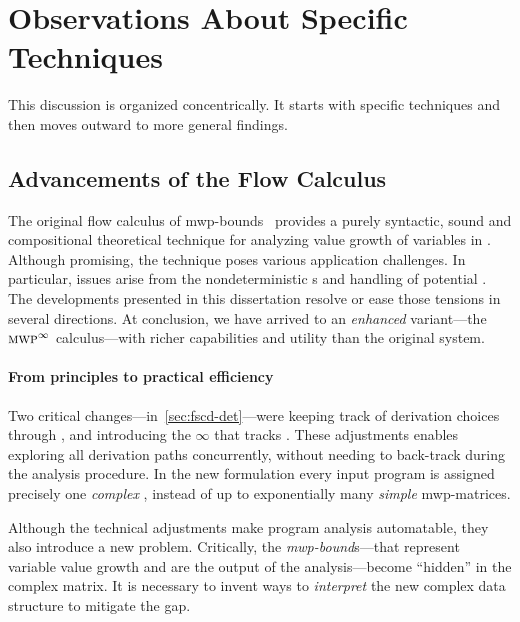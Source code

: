 \section{Observations About Specific Techniques}
\label{sec:res-specific}

This discussion is organized concentrically. It starts with specific techniques
and then moves outward to more general findings.

\subsection{Advancements of the Flow Calculus}
\label{subsec:res-flow-calc}

The original flow calculus of mwp-bounds~\cite{jones2009}
provides a purely syntactic, sound and
compositional theoretical technique for analyzing value
growth of variables in . Although promising, the
technique poses various application challenges. In particular, issues arise from
the nondeterministic s and handling of
potential . The developments presented in this
dissertation resolve or ease those tensions in several directions. At
conclusion, we have arrived to an \emph{enhanced} variant---\ie the
\(\textnormal{\textsc{mwp}}^\infty\) calculus---with richer capabilities and utility than the
original system.

\paragraph*{From principles to practical efficiency}
Two critical changes---in~\autoref{sec:fscd-det}---were keeping track of
derivation choices through \emph{}, and introducing
the  \(\infty\) that tracks . These adjustments enables exploring all derivation paths
{concurrently}, without needing to back-track during the analysis procedure. In
the new formulation every input program is assigned precisely one \emph{complex}
, instead of up to exponentially many \emph{simple} mwp-matrices.

Although the technical adjustments make program analysis automatable, they also
introduce a new problem. Critically, the \emph{mwp-bound}s---that represent
variable value growth and are the output of the analysis---become
\enquote{hidden} in the complex matrix. It is necessary to invent ways to
\emph{interpret} the new complex data structure to mitigate the gap.

